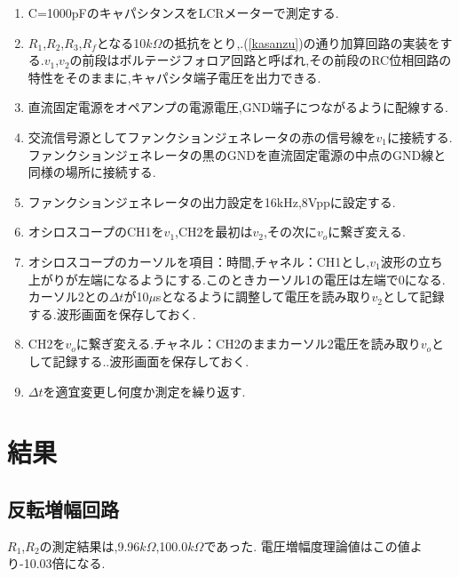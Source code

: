 \documentclass[a4j,10pt,dvipdfmx]{jarticle}
\begin{document}
\begin{enumerate}
  \item C=1000pFのキャパシタンスをLCRメーターで測定する.
  \item $R_1$,$R_2$,$R_3$,$R_f$となる10$k\Omega$の抵抗をとり,.(\ref{kasanzu})の通り加算回路の実装をする.$v_1$,$v_2$の前段はボルテージフォロア回路と呼ばれ,その前段のRC位相回路の特性をそのままに,キャパシタ端子電圧を出力できる.
  \item 直流固定電源をオペアンプの電源電圧,GND端子につながるように配線する.
  \item 交流信号源としてファンクションジェネレータの赤の信号線を$v_1$に接続する.ファンクションジェネレータの黒のGNDを直流固定電源の中点のGND線と同様の場所に接続する.
  \item ファンクションジェネレータの出力設定を16kHz,8Vppに設定する.
  \item オシロスコープのCH1を$v_1$,CH2を最初は$v_2$,その次に$v_o$に繋ぎ変える.
  \item オシロスコープのカーソルを項目：時間,チャネル：CH1とし,$v_1$波形の立ち上がりが左端になるようにする.このときカーソル1の電圧は左端で0になる.カーソル2との$\Delta t$が10$\mu$sとなるように調整して電圧を読み取り$v_2$として記録する.波形画面を保存しておく.
  \item CH2を$v_o$に繋ぎ変える.チャネル：CH2のままカーソル2電圧を読み取り$v_o$として記録する..波形画面を保存しておく.
  \item $\Delta t$を適宜変更し何度か測定を繰り返す.
\end{enumerate}
\section{結果}

\subsection{反転増幅回路}
$R_1$,$R_2$の測定結果は,9.96$k\Omega$,100.0$k\Omega$であった.
電圧増幅度理論値はこの値より-10.03倍になる.
\end{document}
